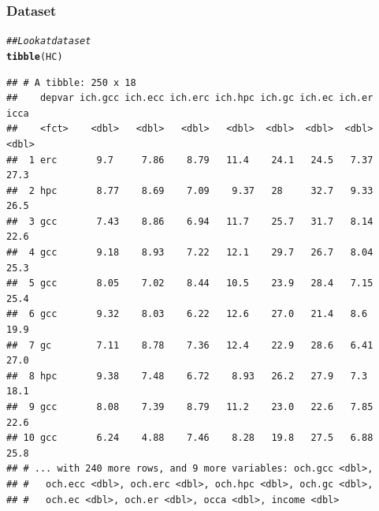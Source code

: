 \documentclass{beamer}\usepackage[]{graphicx}\usepackage[]{color}
\makeatletter
\newcommand{\hlnum}[1]{\textcolor[rgb]{0.686,0.059,0.569}{#1}}%
\newcommand{\hlstr}[1]{\textcolor[rgb]{0.192,0.494,0.8}{#1}}%
\newcommand{\hlcom}[1]{\textcolor[rgb]{0.678,0.584,0.686}{\textit{#1}}}%
\newcommand{\hlopt}[1]{\textcolor[rgb]{0,0,0}{#1}}%
\newcommand{\hlstd}[1]{\textcolor[rgb]{0.345,0.345,0.345}{#1}}%
\newcommand{\hlkwb}[1]{\textcolor[rgb]{0.69,0.353,0.396}{#1}}%
\newcommand{\hlkwc}[1]{\textcolor[rgb]{0.333,0.667,0.333}{#1}}%
\newcommand{\hlkwd}[1]{\textcolor[rgb]{0.737,0.353,0.396}{\textbf{#1}}}%
\newenvironment{kframe}{%
 \def\at@end@of@kframe{}%
 \ifinner\ifhmode%
  \def\at@end@of@kframe{\end{minipage}}%
  \begin{minipage}{\columnwidth}%
 \fi\fi%
 \def\FrameCommand##1{\hskip\@totalleftmargin \hskip-\fboxsep
 \colorbox{shadecolor}{##1}\hskip-\fboxsep
     \hskip-\linewidth \hskip-\@totalleftmargin \hskip\columnwidth}%
 \MakeFramed {\advance\hsize-\width
   \@totalleftmargin\z@ \linewidth\hsize
   \@setminipage}}%
 {\par\unskip\endMakeFramed%
 \at@end@of@kframe}
\newenvironment{knitrout}{}{} %
\makeatother
\begin{document}
\begin{frame}[fragile]\frametitle{Dataset}
\begin{knitrout}\footnotesize
{}\color{fgcolor}\begin{kframe}
\begin{alltt}
\hlcom{## Look at dataset}
\hlkwd{tibble}\hlstd{(HC)}
\end{alltt}
\begin{verbatim}
## # A tibble: 250 x 18
##    depvar ich.gcc ich.ecc ich.erc ich.hpc ich.gc ich.ec ich.er  icca
##    <fct>    <dbl>   <dbl>   <dbl>   <dbl>  <dbl>  <dbl>  <dbl> <dbl>
##  1 erc       9.7     7.86    8.79   11.4    24.1   24.5   7.37  27.3
##  2 hpc       8.77    8.69    7.09    9.37   28     32.7   9.33  26.5
##  3 gcc       7.43    8.86    6.94   11.7    25.7   31.7   8.14  22.6
##  4 gcc       9.18    8.93    7.22   12.1    29.7   26.7   8.04  25.3
##  5 gcc       8.05    7.02    8.44   10.5    23.9   28.4   7.15  25.4
##  6 gcc       9.32    8.03    6.22   12.6    27.0   21.4   8.6   19.9
##  7 gc        7.11    8.78    7.36   12.4    22.9   28.6   6.41  27.0
##  8 hpc       9.38    7.48    6.72    8.93   26.2   27.9   7.3   18.1
##  9 gcc       8.08    7.39    8.79   11.2    23.0   22.6   7.85  22.6
## 10 gcc       6.24    4.88    7.46    8.28   19.8   27.5   6.88  25.8
## # ... with 240 more rows, and 9 more variables: och.gcc <dbl>,
## #   och.ecc <dbl>, och.erc <dbl>, och.hpc <dbl>, och.gc <dbl>,
## #   och.ec <dbl>, och.er <dbl>, occa <dbl>, income <dbl>
\end{verbatim}
\end{kframe}
\end{knitrout}
\end{frame}

\end{document}
